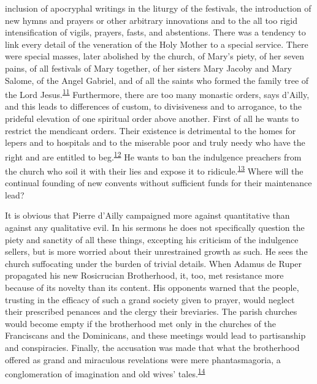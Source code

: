 inclusion of apocryphal writings in the liturgy of the festivals, the
introduction of new hymns and prayers or other arbitrary innovations and
to the all too rigid intensification of vigils, prayers, fasts, and
abstentions. There was a tendency to link every detail of the veneration
of the Holy Mother to a special service. There were special masses,
later abolished by the church, of Mary's piety, of her seven pains, of
all festivals of Mary together, of her sisters Mary Jacoby and Mary
Salome, of the Angel Gabriel, and of all the saints who formed the
family tree of the Lord
Jesus.\textsuperscript{\protect\hypertarget{13_Chapter_Six__THE_DEPICTION_OF_TH.xhtmlux5cux23id_1249}{\protect\hyperlink{23_NOTES.xhtmlux5cux23id_1250}{11}}}
Furthermore, there are too many monastic orders, says d'Ailly, and this
leads to differences of custom, to divisiveness and to arrogance, to the
prideful elevation of one spiritual order above another. First of all he
wants to restrict the mendicant orders. Their existence is detrimental
to the homes for lepers and to hospitals and to the miserable poor and
truly needy who have the right and are entitled to
beg.\textsuperscript{\protect\hypertarget{13_Chapter_Six__THE_DEPICTION_OF_TH.xhtmlux5cux23id_1247}{\protect\hyperlink{23_NOTES.xhtmlux5cux23id_1248}{12}}}
He wants to ban the indulgence preachers from the church who soil it
with their lies and expose it to
ridicule.\textsuperscript{\protect\hypertarget{13_Chapter_Six__THE_DEPICTION_OF_TH.xhtmlux5cux23id_1245}{\protect\hyperlink{23_NOTES.xhtmlux5cux23id_1246}{13}}}
Where will the continual founding of new convents without sufficient
funds for their maintenance lead?

It is obvious that Pierre d'Ailly campaigned more against quantitative
than against any qualitative evil. In his sermons he does not
specifically question the piety and sanctity of all these things,
excepting his criticism of the indulgence sellers, but is more worried
\protect\hypertarget{13_Chapter_Six__THE_DEPICTION_OF_TH.xhtmlux5cux23page_176}{}{}about
their unrestrained growth as such. He sees the church suffocating under
the burden of trivial details. When Adamus de Ruper propagated his new
Rosicrucian Brotherhood, it, too, met resistance more because of its
novelty than its content. His opponents warned that the people, trusting
in the efficacy of such a grand society given to prayer, would neglect
their prescribed penances and the clergy their breviaries. The parish
churches would become empty if the brotherhood met only in the churches
of the Franciscans and the Dominicans, and these meetings would lead to
partisanship and conspiracies. Finally, the accusation was made that
what the brotherhood offered as grand and miraculous revelations were
mere phantasmagoria, a conglomeration of imagination and old wives'
tales.\textsuperscript{\protect\hypertarget{13_Chapter_Six__THE_DEPICTION_OF_TH.xhtmlux5cux23id_1243}{\protect\hyperlink{23_NOTES.xhtmlux5cux23id_1244}{14}}}

